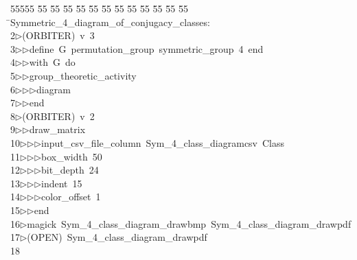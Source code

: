 %
%
\begin{tabbing}
55555 \= 55 \= 55 \= 55 \= 55 \= 55 \= 55 \= 55 \= 55 \= 55 \= 55 \= 55 \= 55 \= \>Symmetric\_4\_diagram\_of\_conjugacy\_classes:\\[0pt]
2\>$\triangleright$\>(ORBITER)\ v\ 3\ \\[0pt]
3\>$\triangleright$\>$\triangleright$\>define\ G\ permutation\_group\ symmetric\_group\ 4\ end\ \\[0pt]
4\>$\triangleright$\>$\triangleright$\>with\ G\ do\ \\[0pt]
5\>$\triangleright$\>$\triangleright$\>group\_theoretic\_activity\ \\[0pt]
6\>$\triangleright$\>$\triangleright$\>$\triangleright$\>diagram\ \\[0pt]
7\>$\triangleright$\>$\triangleright$\>end\\[0pt]
8\>$\triangleright$\>(ORBITER)\ v\ 2\ \\[0pt]
9\>$\triangleright$\>$\triangleright$\>draw\_matrix\ \\[0pt]
10\>$\triangleright$\>$\triangleright$\>$\triangleright$\>input\_csv\_file\_column\ Sym\_4\_class\_diagramcsv\ Class\ \\[0pt]
11\>$\triangleright$\>$\triangleright$\>$\triangleright$\>box\_width\ 50\ \\[0pt]
12\>$\triangleright$\>$\triangleright$\>$\triangleright$\>bit\_depth\ 24\ \\[0pt]
13\>$\triangleright$\>$\triangleright$\>$\triangleright$\>indent\ 15\ \\[0pt]
14\>$\triangleright$\>$\triangleright$\>$\triangleright$\>color\_offset\ 1\ \\[0pt]
15\>$\triangleright$\>$\triangleright$\>end\\[0pt]
16\>$\triangleright$\>magick\ Sym\_4\_class\_diagram\_drawbmp\ Sym\_4\_class\_diagram\_drawpdf\\[0pt]
17\>$\triangleright$\>(OPEN)\ Sym\_4\_class\_diagram\_drawpdf\\[0pt]
18\>\end{tabbing}
